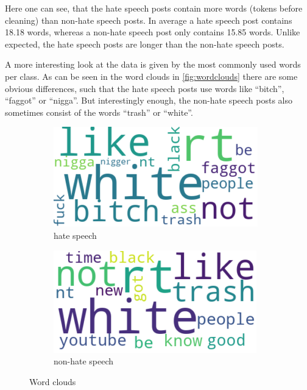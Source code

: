 Here one can see, that the hate speech posts contain more words (tokens before cleaning) than non-hate speech posts. In average a hate speech post contains 18.18 words, whereas a non-hate speech post only contains 15.85 words. Unlike expected, the hate speech posts are longer than the non-hate speech posts.

A more interesting look at the data is given by the most commonly used words per class. As can be seen in the word clouds in \autoref{fig:wordclouds} there are some obvious differences, such that the hate speech posts use words like \enquote{bitch}, \enquote{faggot} or \enquote{nigga}. But interestingly enough, the non-hate speech posts also sometimes consist of the words \enquote{trash} or \enquote{white}.

\begin{figure}[ht]
    \hfill
    \begin{subfigure}[b]{0.4\textwidth}
        \centering
        \includegraphics[width=\textwidth]{figures/Wordcloud-HateSpeech-tokens.png}
        \caption{hate speech}
    \end{subfigure}
    \hfill
    \begin{subfigure}[b]{0.4\textwidth}
        \centering
        \includegraphics[width=\textwidth]{figures/Wordcloud-Non-HateSpeech-tokens.png}
        \caption{non-hate speech}
    \end{subfigure}
    \hfill
    \caption{Word clouds}
    \label{fig:wordclouds}
\end{figure}

